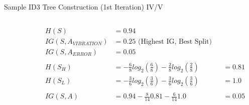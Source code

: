 \documentclass[document.tex]{subfiles}
\begin{document}
\begin{frame}{Sample ID3 Tree Construction (1st Iteration) IV/V}
\begin{columns}
\begin{column}{0.4\textwidth}
\begin{table}
                \end{table}
            \end{column}
            \begin{column}{0.6\textwidth}
                \begin{align*}
                    H(S) &= 0.94 \\
                    IG(S, A_{VIBRATION}) &= 0.25 \text{ (Highest IG, Best Split)} \\
                    IG(S, A_{ERROR}) &= 0.05 \\\\
                    H(S_H) &= -\frac{6}{8}log_2(\frac{6}{8}) - \frac{2}{8}log_2(\frac{2}{8}) &&= 0.81 \\
                    H(S_L) &= -\frac{3}{6}log_2(\frac{3}{6}) - \frac{3}{6}log_2(\frac{3}{6}) &&= 1.0 \\\\
                    IG(S, A) &= 0.94 - \frac{8}{14} 0.81 - \frac{6}{14} 1.0 &&= 0.05
                \end{align*}
            \end{column}
        \end{columns}
    \end{frame}	
\end{document}

